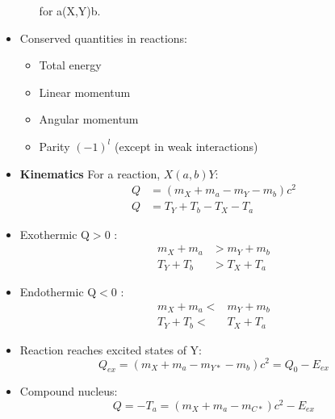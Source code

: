 \documentclass[letter]{article}
\begin{document}
\begin{itemize}
\begin{itemize}
\begin{equation*}
    \end{equation*}
    for a(X,Y)b.
  \end{itemize}
\item Conserved quantities in reactions:
  \begin{itemize}
  \item Total energy
  \item Linear momentum
  \item Angular momentum
  \item Parity $(-1)^l$ (except in weak interactions)
\end{itemize}
\item \textbf{Kinematics} For a reaction, $X(a,b)Y$:
  \begin{equation*}
    \begin{split}
      Q&= (m_{X}+m_{a}-m_{Y}-m_{b})c^{2}\\
      Q& =T_{Y}+T_{b}-T_{X}-T_{a}
\end{split}
\end{equation*}
\item Exothermic Q$>$0 :
  \begin{equation*}
  \begin{split}
   m_{X}+m_{a}&>m_{Y}+m_{b}\\
   T_{Y}+T_{b}&>T_{X}+T_{a}
  \end{split}
\end{equation*}
\item Endothermic Q$<$0 :
  \begin{equation*}
  \begin{split}
    m_{X}+m_{a}<&m_{Y}+m_{b}\\
T_{Y}+T_{b}<&T_{X}+T_{a}
  \end{split}
\end{equation*}
\item Reaction reaches excited states of Y:
  \begin{equation*}
Q_{ex} = (m_{X}+m_{a}-m_{Y*}-m_{b})c^{2}  = Q_{0}-E_{ex}
\end{equation*}
\item Compound nucleus:
  \begin{equation*}
Q = -T_{a} = (m_{X}+m_{a}-m_{C*})c^{2}-E_{ex}
\end{equation*}

\end{itemize}



\end{document}
